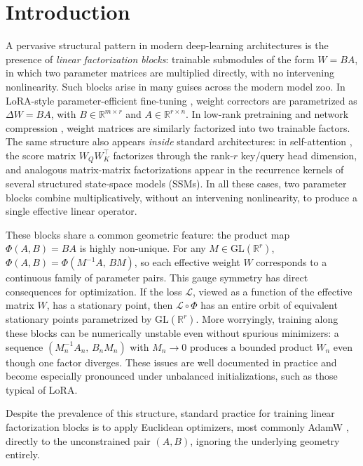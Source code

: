 \documentclass[11pt,a4paper]{article}
\numberwithin{equation}{section}
\let\Delta\varDelta
\newcommand{\tr}{^{\top}} %
\newcommand{\R}{\mathbb{R}}
\newcommand{\cL}{{\mathcal L}}
\theoremstyle{plain}
\theoremstyle{definition}
\theoremstyle{remark}
\begin{document}
\section{Introduction}\label{sec:introduction}
A pervasive structural pattern in modern deep-learning architectures is the presence of \emph{linear factorization blocks}: trainable submodules of the form $W = BA$, in which two parameter matrices are multiplied directly, with no intervening nonlinearity. Such blocks arise in many guises across the modern model zoo. In LoRA-style parameter-efficient fine-tuning \cite{hu2022lora,zhang2023adaptive,Hayou2024loraplus,ZhangPilanci2024,zhao2024galore,lialin2024relora,schotthofer2025geolora}, weight correctors are parametrized as $\Delta W = BA$, with $B \in \R^{m\times r}$ and $A \in \R^{r \times n}$. In low-rank pretraining \cite{MLSYS2021_94cb2887,khodak2021initialization,schotthoefer2025} and network compression \cite{Vogels:2019,saha2023matrix,mo2025parameter,Schotthoefer2022lottery}, weight matrices are similarly factorized into two trainable factors. The same structure also appears \emph{inside} standard architectures: in self-attention \cite{NIPS2017_3f5ee243}, the score matrix $W_Q W_K\tr$ factorizes through the rank-$r$ key/query head dimension, and analogous matrix-matrix factorizations appear in the recurrence kernels of several structured state-space models (SSMs). In all these cases, two parameter blocks combine multiplicatively, without an intervening nonlinearity, to produce a single effective linear operator.

These blocks share a common geometric feature: the product map $\Phi(A,B) = BA$ is highly non-unique. For any $M \in \mathrm{GL}(\R^r)$, $\Phi(A,B) = \Phi(M^{-1}A,\,BM)$, so each effective weight $W$ corresponds to a continuous family of parameter pairs. This gauge symmetry has direct consequences for optimization. If the loss $\cL$, viewed as a function of the effective matrix $W$, has a stationary point, then $\cL \circ \Phi$ has an entire orbit of equivalent stationary points parametrized by $\mathrm{GL}(\R^r)$. More worryingly, training along these blocks can be numerically unstable even without spurious minimizers: a sequence $(M_n^{-1} A_n,\, B_n M_n)$ with $M_n \to 0$ produces a bounded product $W_n$ even though one factor diverges. These issues are well documented in practice \cite{Mishra2014,Schotthoefer2022lottery,zangrando2024geometry} and become especially pronounced under unbalanced initializations, such as those typical of LoRA.

Despite the prevalence of this structure, standard practice for training linear factorization blocks is to apply Euclidean optimizers, most commonly AdamW \cite{Loshchilov:2019}, directly to the unconstrained pair $(A,B)$, ignoring the underlying geometry entirely. 
\end{document}
